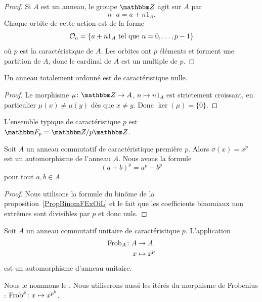 \begin{proof}
    Si \( A\) est un anneau, le groupe \( \eZ\) agit sur \( A\) par
    \begin{equation}
        n\cdot a=a+n1_A.
    \end{equation}
    Chaque orbite de cette action est de la forme
    \begin{equation}
        \mathcal{O}_a=\{ a+n1_A\text{ tel que } n=0,\ldots, p-1 \}
    \end{equation}
    où \( p\) est la caractéristique de \( A\). Les orbites ont \( p\) éléments et forment une partition de \( A\), donc le cardinal de \( A\) est un multiple de \( p\).
\end{proof}

\begin{lemma}        \label{LEMooJQIKooQgukqn}
    Un anneau totalement ordonné est de caractéristique nulle.
\end{lemma}

\begin{proof}
    Le morphisme \( \mu\colon \eZ\to A\), \( n\mapsto n 1_A\) est strictement croissant, en particulier \( \mu(x)\neq \mu(y)\) dès que \( x\neq y\). Donc \( \ker(\mu)=\{ 0 \}\).
\end{proof}

L'ensemble typique de caractéristique \( p\) est \( \eF_p=\eZ/p\eZ\).



\begin{proposition}     \label{Propqrrdem}
    Soit \( A\) un anneau commutatif de caractéristique première \( p\). Alors \( \sigma(x)=x^p\) est un automorphisme de l'anneau \( A\). Nous avons la formule
    \begin{equation}
        (a+b)^p=a^p+b^p
    \end{equation}
    pour tout \( a,b\in A\).
\end{proposition}

\begin{proof}
    Nous utilisons la formule du binôme de la proposition~\ref{PropBinomFExOiL} et le fait que les coefficients binomiaux non extrêmes sont divisibles par \( p\) et donc nuls.
\end{proof}

\begin{proposition} \label{PropFrobHAMkTY}
    Soit \( A\) un anneau commutatif unitaire de caractéristique \( p\). L'application
    \begin{equation}
        \begin{aligned}
            \operatorname{Frob}_A\colon A&\to A \\
            x&\mapsto x^p
        \end{aligned}
    \end{equation}
    est un automorphisme d'anneau unitaire.
\end{proposition}
Nous le nommons le . Nous utiliserons aussi les itérés du morphisme de Frobenius : \( \operatorname{Frob}^k\colon x\mapsto x^{p^k}\).

